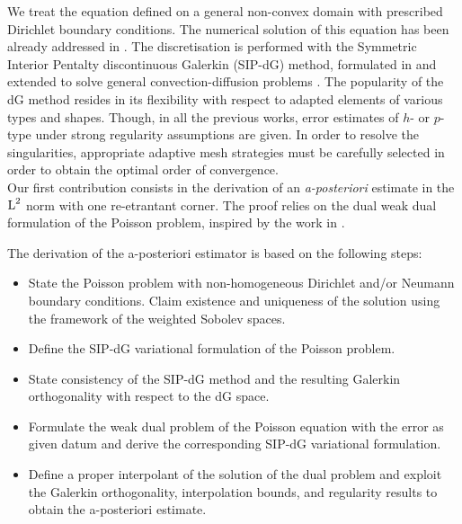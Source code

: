 \documentclass[a4paper,11pt]{article}
\begin{document}
{We treat the equation defined on a general non-convex domain with prescribed Dirichlet boundary conditions. The numerical solution of this equation has been already addressed in \cite{CKW:2002,SH:2016,ZS:2002}. The discretisation is performed with the Symmetric Interior Pentalty discontinuous Galerkin (SIP-dG) method, formulated in \cite{AD:1982,ABCM:2000,ABCM:2002} and extended to solve general convection-diffusion problems \cite{Cockburn:1998,Cockburn:2001}. The popularity of the dG method resides in its flexibility with respect to adapted elements of various types and shapes. Though, in all the previous works, error estimates of $h$- or $p$-type under strong regularity assumptions are given. In order to resolve the singularities, appropriate adaptive mesh strategies must be carefully selected in order to obtain the optimal order of convergence.\\

Our first contribution consists in the derivation of an \textit{a-posteriori} estimate in the $\operatorname L^{2}$ norm  with one re-etrantant corner. The proof relies on the dual weak dual formulation of the Poisson problem, inspired by the work in \cite{Wihler:2003,Schwab:1998}.

The derivation of the a-posteriori estimator is based on the following steps:

\begin{itemize}

\item State the Poisson problem with non-homogeneous Dirichlet and/or Neumann boundary conditions. Claim existence and uniqueness of the solution using the framework of the weighted Sobolev spaces.
  
\item Define the SIP-dG variational formulation of the Poisson problem.
    
\item State consistency of the SIP-dG method and the resulting Galerkin orthogonality with respect to the dG space.
    
\item Formulate the weak dual problem of the Poisson equation with the error as given datum and derive the corresponding SIP-dG variational formulation.
    
\item Define a proper interpolant of the solution of the dual problem and exploit the Galerkin orthogonality, interpolation bounds, and regularity results \cite{BG:1988} to obtain the a-posteriori estimate.   
    

\end{itemize}}
\end{document}

